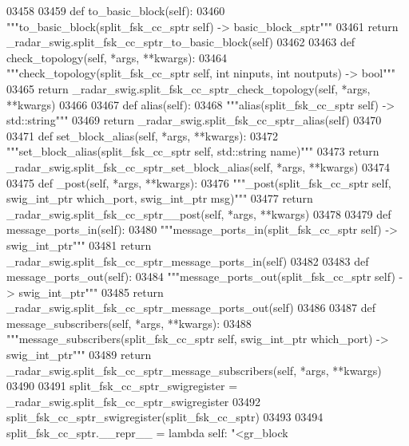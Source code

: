 \begin{DoxyCode}
{{{{{{{{{{{{03458 
03459     \textcolor{keyword}{def }to_basic_block(self):
03460         \textcolor{stringliteral}{"""to\_basic\_block(split\_fsk\_cc\_sptr self) -> basic\_block\_sptr"""}
03461         \textcolor{keywordflow}{return} \_radar\_swig.split\_fsk\_cc\_sptr\_to\_basic\_block(self)
03462 
03463     \textcolor{keyword}{def }check_topology(self, *args, **kwargs):
03464         \textcolor{stringliteral}{"""check\_topology(split\_fsk\_cc\_sptr self, int ninputs, int noutputs) -> bool"""}
03465         \textcolor{keywordflow}{return} \_radar\_swig.split\_fsk\_cc\_sptr\_check\_topology(self, *args, **kwargs)
03466 
03467     \textcolor{keyword}{def }alias(self):
03468         \textcolor{stringliteral}{"""alias(split\_fsk\_cc\_sptr self) -> std::string"""}
03469         \textcolor{keywordflow}{return} \_radar\_swig.split\_fsk\_cc\_sptr\_alias(self)
03470 
03471     \textcolor{keyword}{def }set_block_alias(self, *args, **kwargs):
03472         \textcolor{stringliteral}{"""set\_block\_alias(split\_fsk\_cc\_sptr self, std::string name)"""}
03473         \textcolor{keywordflow}{return} \_radar\_swig.split\_fsk\_cc\_sptr\_set\_block\_alias(self, *args, **kwargs)
03474 
03475     \textcolor{keyword}{def }_post(self, *args, **kwargs):
03476         \textcolor{stringliteral}{"""\_post(split\_fsk\_cc\_sptr self, swig\_int\_ptr which\_port, swig\_int\_ptr msg)"""}
03477         \textcolor{keywordflow}{return} \_radar\_swig.split\_fsk\_cc\_sptr\_\_post(self, *args, **kwargs)
03478 
03479     \textcolor{keyword}{def }message_ports_in(self):
03480         \textcolor{stringliteral}{"""message\_ports\_in(split\_fsk\_cc\_sptr self) -> swig\_int\_ptr"""}
03481         \textcolor{keywordflow}{return} \_radar\_swig.split\_fsk\_cc\_sptr\_message\_ports\_in(self)
03482 
03483     \textcolor{keyword}{def }message_ports_out(self):
03484         \textcolor{stringliteral}{"""message\_ports\_out(split\_fsk\_cc\_sptr self) -> swig\_int\_ptr"""}
03485         \textcolor{keywordflow}{return} \_radar\_swig.split\_fsk\_cc\_sptr\_message\_ports\_out(self)
03486 
03487     \textcolor{keyword}{def }message_subscribers(self, *args, **kwargs):
03488         \textcolor{stringliteral}{"""message\_subscribers(split\_fsk\_cc\_sptr self, swig\_int\_ptr which\_port) -> swig\_int\_ptr"""}
03489         \textcolor{keywordflow}{return} \_radar\_swig.split\_fsk\_cc\_sptr\_message\_subscribers(self, *args, **kwargs)
03490 
03491 split\_fsk\_cc\_sptr\_swigregister = \_radar\_swig.split\_fsk\_cc\_sptr\_swigregister
03492 split_fsk_cc_sptr_swigregister(split\_fsk\_cc\_sptr)
03493 
03494 split\_fsk\_cc\_sptr.\_\_repr\_\_ = \textcolor{keyword}{lambda} self: \textcolor{stringliteral}{"<gr\_block %
}}}}}}}}}}}}}
\end{DoxyCode}
